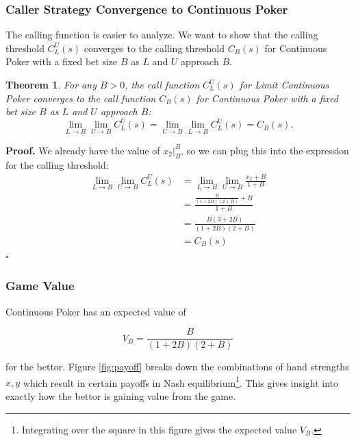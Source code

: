 \documentclass[a4paper,12pt]{article}
\theoremstyle{plain}
\newtheorem{theorem}{Theorem}[section]
\theoremstyle{definition}
\newenvironment{customproof}[1][Proof]{\noindent\textbf{#1.} }{\hfill$\square$\vspace{1em}}
\begin{document}
\subsubsection{Caller Strategy Convergence to Continuous Poker}

The calling function is easier to analyze. We want to show that the calling threshold $C_L^U(s)$ converges to the calling threshold $C_B(s)$ for Continuous Poker with a fixed bet size $B$ as $L$ and $U$ approach $B$.

\begin{theorem}
     For any $B > 0$, the call function $C_L^U(s)$ for Limit Continuous Poker converges to the call function $C_B(s)$ for Continuous Poker with a fixed bet size $B$ as $L$ and $U$ approach $B$:
\[
\lim_{L \to B} \lim_{U \to B} C_L^U(s) = \lim_{U \to B} \lim_{L \to B} C_L^U(s) = C_B(s).
\]
\end{theorem}

\begin{customproof}
We already have the value of $x_2|_B^B$, so we can plug this into the expression for the calling threshold:
\begin{align*}
    \lim_{L \to B} \lim_{U \to B} C_L^U(s) & = \lim_{L \to B} \lim_{U \to B} \frac{x_2+B}{1+B} \\
    & = \frac{\frac{B}{(1+2B)(2+B)} + B}{1+B} \\
    & = \frac{B(3+2B)}{(1+2B)(2+B)} \\
    & = C_B(s)
\end{align*}
\end{customproof}

\subsubsection{Game Value}

Continuous Poker has an expected value of 

$$ V_B = \frac{B}{(1+2B)(2+B)} $$

for the bettor. Figure \ref{fig:payoff} breaks down the combinations of hand strengths $x, y$ which result in certain payoffs in Nash equilibrium\footnote{Integrating over the square in this figure gives the expected value $V_B$.}. This gives insight into exactly how the bettor is gaining value from the game. 
\end{document}
